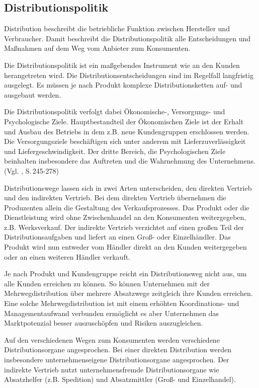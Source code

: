 \subsection{Distributionspolitik} \label{distro}
    Distribution beschreibt die betriebliche Funktion zwischen Hersteller und Verbraucher. Damit beschreibt die
    Distributionspolitik alle Entscheidungen und Maßnahmen auf dem Weg vom Anbieter zum Konsumenten.

    \noindent
    Die Distributionspolitik ist ein maßgebendes Instrument wie an den Kunden herangetreten wird. Die
    Distributionsentscheidungen sind im Regelfall langfristig ausgelegt. Es müssen je nach Produkt komplexe
    Distributionsketten auf- und ausgebaut werden.

    \noindent
    Die Distributionspolitik verfolgt dabei Ökonomische-, Versorgungs- und Psychologische Ziele. Hauptbestandteil der
    Ökonomischen Ziele ist der Erhalt und Ausbau des Betriebs in dem z.B. neue Kundengruppen erschlossen werden. Die
    Versorgungsziele beschäftigen sich unter anderem mit Lieferzuverlässigkeit und Liefergeschwindigkeit. Der dritte
    Bereich, die Psychologischen Ziele beinhalten insbesondere das Auftreten und die Wahrnehmung des Unternehmens.
    (Vgl. \cite{Bruhn2014}, S.\,245-278)

    \noindent
    Distributionswege lassen sich in zwei Arten unterscheiden, den direkten Vertrieb und den indirekten Vertrieb. Bei
    dem direkten Vertrieb übernehmen die Produzenten allein die Gestaltung des Verkaufsprozesses. Das Produkt oder die
    Dienstleistung wird ohne Zwischenhandel an den Konsumenten weitergegeben, z.B. Werksverkauf. Der indirekte Vertrieb
    verzichtet auf einen großen Teil der Distributionsaufgaben und liefert an einen Groß- oder Einzelhändler. Das
    Produkt wird nun entweder vom Händler direkt an den Kunden weitergegeben oder an einen weiteren Händler verkauft.

    \noindent
    Je nach Produkt und Kundengruppe reicht ein Distributionsweg nicht aus, um alle Kunden erreichen zu können. So
    können Unternehmen mit der Mehrwegdistribution über mehrere Absatzwege zeitgleich ihre Kunden erreichen. Eine solche
    Mehrwegdistribution ist mit einem erhöhten Koordinations- und Managementaufwand verbunden ermöglicht es aber
    Unternehmen das Marktpotenzial besser auszuschöpfen und Risiken auszugleichen.

    \noindent
    Auf den verschiedenen Wegen zum Konsumenten werden verschiedene Distributionsorgane angesprochen. Bei einer direkten
    Distribution werden insbesondere unternehmenseigene Distributionsorgane angesprochen. Der indirekte Vertrieb nutzt
    unternehmensfremde Distributionsorgane wie Absatzhelfer (z.B. Spedition) und Absatzmittler (Groß- und Einzelhandel).

